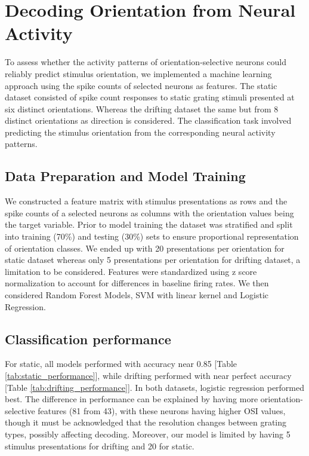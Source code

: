 \documentclass[10pt,twocolumn]{article}
\begin{document}
\section{Decoding Orientation from Neural Activity}

To assess whether the activity patterns of orientation-selective neurons could reliably predict stimulus orientation, we implemented a machine learning approach using the spike counts of selected neurons as features. The static dataset consisted of spike count responses to static grating stimuli presented at six distinct orientations. Whereas the drifting dataset the same but from 8 distinct orientations as direction is considered. The classification task involved predicting the stimulus orientation from the corresponding neural activity patterns.

\subsection{Data Preparation and Model Training}
We constructed a feature matrix with stimulus presentations as rows and the spike counts of a selected neurons as columns with the orientation values being the target variable. Prior to model training the dataset was stratified and split into training (70\%) and testing (30\%) sets to ensure proportional representation of orientation classes. We ended up with 20 presentations per orientation for static dataset whereas only 5 presentations per orientation for drifting dataset, a limitation to be considered. Features were standardized using z score normalization to account for differences in baseline firing rates. We then considered Random Forest Models, SVM with linear kernel and Logistic Regression.

\subsection{Classification performance}

For static, all models performed with accuracy near 0.85 [Table \ref{tab:static_performance}], while drifting performed with near perfect accuracy [Table \ref{tab:drifting_performance}]. In both datasets, logistic regression performed best. The difference in performance can be explained by having more orientation-selective features (81 from 43), with these neurons having higher OSI values, though it must be acknowledged that the resolution changes between grating types, possibly affecting decoding. Moreover, our model is limited by having 5 stimulus presentations for drifting and 20 for static.
\end{document}
